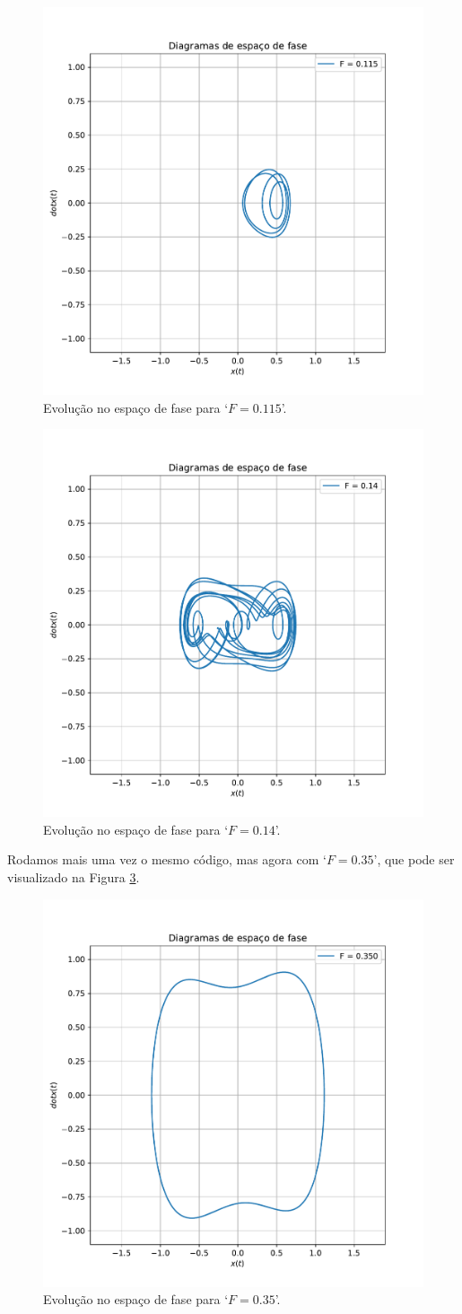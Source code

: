 \documentclass[twoside]{amsart}
\numberwithin{equation}{section}
\begin{document}
\begin{figure}[h]
    \includegraphics[width=0.5\linewidth]{II-1cf115.pdf}
    \caption{Evolução no espaço de fase para `$F=0.115$'.}
    \label{fig4}
\end{figure}

\begin{figure}[h]
    \includegraphics[width=0.5\linewidth]{II-1cf14.pdf}
    \caption{Evolução no espaço de fase para `$F=0.14$'.}
    \label{fig5}
\end{figure}

Rodamos mais uma vez o mesmo código, mas agora com `$F=0.35$', que pode ser visualizado na Figura \ref{fig6}.

\begin{figure}[h]
    \includegraphics[width=0.5\linewidth]{II-1cf35.pdf}
    \caption{Evolução no espaço de fase para `$F=0.35$'.}
    \label{fig6}
\end{figure}
\end{document}
